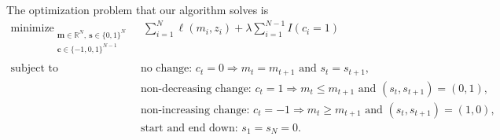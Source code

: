 \documentclass[article]{jss}
\DeclareMathOperator*{\minimize}{minimize}
\newcommand{\RR}{\mathbb R}
\begin{document}
The optimization problem that our algorithm solves is
\begin{align}
  \label{min:op-up-down}
  \minimize_{
  \substack{
  \mathbf m\in\RR^N,\ \mathbf s\in\{0, 1\}^N\\
  \mathbf c\in\{-1, 0,1\}^{N-1}\\
  }
  } &\ \ 
      \sum_{i=1}^N \ell(m_i, z_i) + \lambda \sum_{i=1}^{N-1} I(c_i = 1) \\
  \text{subject to\ \ \ } &\ \text{no change: }c_t = 0 \Rightarrow m_t = m_{t+1}\text{ and }s_t=s_{t+1}, \nonumber\\
    &\ \text{non-decreasing change: }c_t = 1 \Rightarrow m_t \leq m_{t+1}\text{ and }(s_t,s_{t+1})=(0,1),\nonumber\\
    &\ \text{non-increasing change: } c_t = -1 \Rightarrow m_t \geq m_{t+1}\text{ and }(s_t,s_{t+1})=(1,0),\nonumber\\
  & \ \text{start and end down: } s_1=s_N=0.\nonumber
\end{align}
\end{document}
